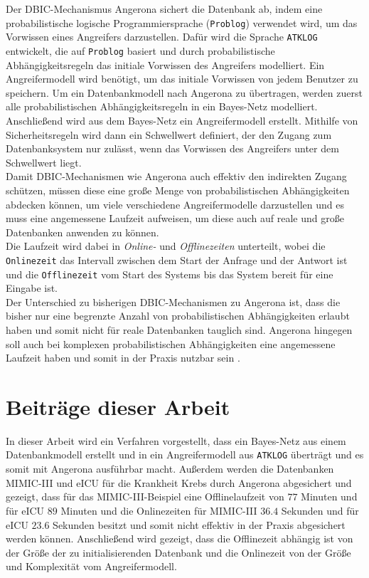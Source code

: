 \documentclass[german,version-2020-11]{uzl-thesis}
\begin{document}
Der DBIC-Mechanismus Angerona sichert die Datenbank ab, indem eine probabilistische logische Programmiersprache (\texttt{Problog}) verwendet wird, um das Vorwissen eines Angreifers darzustellen. Dafür wird die Sprache \texttt{ATKLOG} entwickelt, die auf \texttt{Problog} basiert und durch probabilistische Abhängigkeitsregeln das initiale Vorwissen des Angreifers modelliert. Ein Angreifermodell wird benötigt, um das initiale Vorwissen von jedem Benutzer zu speichern.  Um ein Datenbankmodell nach Angerona zu übertragen, werden zuerst alle probabilistischen Abhängigkeitsregeln in ein Bayes-Netz modelliert. Anschließend wird aus dem Bayes-Netz ein Angreifermodell erstellt. Mithilfe von Sicherheitsregeln wird dann ein Schwellwert definiert, der den Zugang zum Datenbanksystem nur zulässt, wenn das Vorwissen des Angreifers unter dem Schwellwert liegt. \\  
Damit DBIC-Mechanismen wie Angerona auch effektiv den indirekten Zugang schützen, müssen diese eine große Menge von probabilistischen Abhängigkeiten abdecken können, um viele verschiedene Angreifermodelle darzustellen und es muss eine angemessene Laufzeit aufweisen, um diese auch auf reale und große Datenbanken anwenden zu können.\\
Die Laufzeit wird dabei in \emph{Online-} und \emph{Offlinezeiten} unterteilt, wobei die \texttt{Onlinezeit}  das Intervall zwischen dem Start der Anfrage und der Antwort ist und die \texttt{Offlinezeit}  vom Start des Systems bis das System bereit für eine Eingabe ist. \\
Der Unterschied zu bisherigen DBIC-Mechanismen zu Angerona ist, dass die bisher nur eine begrenzte Anzahl von probabilistischen Abhängigkeiten erlaubt haben und somit nicht für reale Datenbanken tauglich sind. Angerona hingegen soll auch bei komplexen probabilistischen Abhängigkeiten eine angemessene Laufzeit haben und somit in der Praxis nutzbar sein \cite{guarnieri2017securing}. \\

\section{Beiträge dieser Arbeit}
In dieser Arbeit wird ein Verfahren vorgestellt, dass ein Bayes-Netz aus einem Datenbankmodell erstellt und in ein Angreifermodell aus \texttt{ATKLOG} überträgt und es somit mit Angerona ausführbar macht. Außerdem werden die Datenbanken MIMIC-III und eICU für die Krankheit Krebs durch Angerona abgesichert und gezeigt, dass für das MIMIC-III-Beispiel eine Offlinelaufzeit von $77$ Minuten und für eICU $89$ Minuten und die Onlinezeiten für MIMIC-III $36.4$ Sekunden und für eICU $23.6$ Sekunden besitzt und somit nicht effektiv in der Praxis abgesichert werden können. Anschließend wird gezeigt, dass die Offlinezeit abhängig ist von der Größe der zu initialisierenden Datenbank und die Onlinezeit von der Größe und Komplexität vom Angreifermodell.
\end{document}

